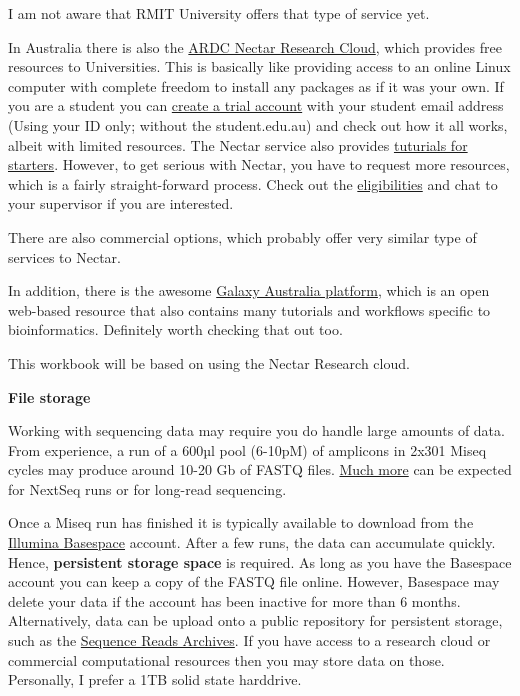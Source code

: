 \documentclass[
]{book}
\begin{document}
I am not aware that RMIT University offers that type of service yet.

In Australia there is also the \href{https://ardc.edu.au/services/nectar-research-cloud/}{ARDC Nectar Research Cloud}, which provides free resources to Universities. This is basically like providing access to an online Linux computer with complete freedom to install any packages as if it was your own. If you are a student you can \href{https://dashboard.rc.nectar.org.au/}{create a trial account} with your student email address (Using your ID only; without the student.edu.au) and check out how it all works, albeit with limited resources. The Nectar service also provides \href{https://tutorials.rc.nectar.org.au/}{tuturials for starters}. However, to get serious with Nectar, you have to request more resources, which is a fairly straight-forward process. Check out the \href{https://support.ehelp.edu.au/support/solutions/articles/6000068044-managing-an-allocation}{eligibilities} and chat to your supervisor if you are interested.

There are also commercial options, which probably offer very similar type of services to Nectar.

In addition, there is the awesome \href{https://usegalaxy.org.au/}{Galaxy Australia platform}, which is an open web-based resource that also contains many tutorials and workflows specific to bioinformatics. Definitely worth checking that out too.

This workbook will be based on using the Nectar Research cloud.

\textbf{File storage}

Working with sequencing data may require you do handle large amounts of data. From experience, a run of a 600µl pool (6-10pM) of amplicons in 2x301 Miseq cycles may produce around 10-20 Gb of FASTQ files. \href{https://sapac.support.illumina.com/bulletins/2018/01/approximate-sizes-of-sequencing-run-output-folders.html}{Much more} can be expected for NextSeq runs or for long-read sequencing.

Once a Miseq run has finished it is typically available to download from the \href{https://basespace.illumina.com/dashboard}{Illumina Basespace} account. After a few runs, the data can accumulate quickly. Hence, \textbf{persistent storage space} is required. As long as you have the Basespace account you can keep a copy of the FASTQ file online. However, Basespace may delete your data if the account has been inactive for more than 6 months. Alternatively, data can be upload onto a public repository for persistent storage, such as the \href{https://www.ncbi.nlm.nih.gov/sra}{Sequence Reads Archives}. If you have access to a research cloud or commercial computational resources then you may store data on those. Personally, I prefer a 1TB solid state harddrive.
\end{document}
